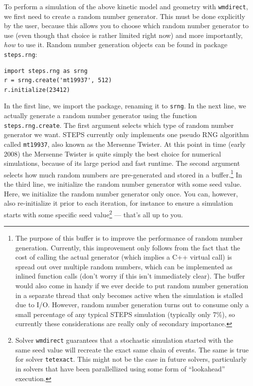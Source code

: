 \documentclass[a4paper,12pt]{book}
\begin{document}
To perform a simulation of the above kinetic model and geometry with \texttt{wmdirect}, we first need to create a random number generator. This must be done explicitly by the user, because this allows you to choose which random number generator to use (even though that choice is rather limited right now) and more importantly, \emph{how} to use it. Random number generation objects can be found in package \texttt{steps.rng}:

\begin{verbatim}
import steps.rng as srng
r = srng.create('mt19937', 512)
r.initialize(23412)
\end{verbatim}

In the first line, we import the package, renaming it to \texttt{srng}. In the next line, we actually generate a random number generator using the function \texttt{steps.rng.create}. The first argument selects which type of random number generator we want. STEPS currently only implements one pseudo RNG algorithm called \texttt{mt19937}, also known as the Mersenne Twister. At this point in time (early 2008) the Mersenne Twister is quite simply the best choice for numerical simulations, because of its large period and fast runtime. The second argument selects how much random numbers are pre-generated and stored in a buffer.\footnote{The purpose of this buffer is to improve the performance of random number generation. Currently, this improvement only follows from the fact that the cost of calling the actual generator (which implies a C++ virtual call) is spread out over multiple random numbers, which can be implemented as inlined function calls (don't worry if this isn't immediately clear). The buffer would also come in handy if we ever decide to put random number generation in a separate thread that only becomes active when the simulation is stalled due to I/O. However, random number generation turns out to consume only a small percentage of any typical STEPS simulation (typically only 7\%), so currently these considerations are really only of secondary importance.} In the third line, we initialize the random number generator with some seed value. Here, we initialize the random number generator only once. You can, however, also re-initialize it prior to each iteration, for instance to ensure a simulation starts with some specific seed value\footnote{Solver \texttt{wmdirect} guarantees that a stochastic simulation started with the same seed value will recreate the exact same chain of events. The same is true for solver \texttt{tetexact}. This might not be the case in future solvers, particularly in solvers that have been parallellized using some form of ``lookahead'' execution.} --- that's all up to you.
\end{document}
